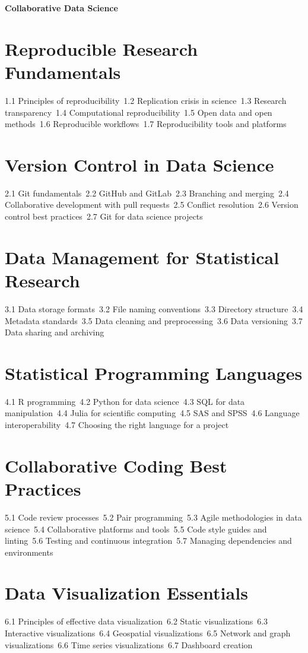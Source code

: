 {\LARGE \bf{Collaborative Data Science}}
\section{Reproducible Research Fundamentals}
1.1 Principles of reproducibility\
1.2 Replication crisis in science\
1.3 Research transparency\
1.4 Computational reproducibility\
1.5 Open data and open methods\
1.6 Reproducible workflows\
1.7 Reproducibility tools and platforms\
\section{Version Control in Data Science}
2.1 Git fundamentals\
2.2 GitHub and GitLab\
2.3 Branching and merging\
2.4 Collaborative development with pull requests\
2.5 Conflict resolution\
2.6 Version control best practices\
2.7 Git for data science projects\
\section{Data Management for Statistical Research}
3.1 Data storage formats\
3.2 File naming conventions\
3.3 Directory structure\
3.4 Metadata standards\
3.5 Data cleaning and preprocessing\
3.6 Data versioning\
3.7 Data sharing and archiving\
\section{Statistical Programming Languages}
4.1 R programming\
4.2 Python for data science\
4.3 SQL for data manipulation\
4.4 Julia for scientific computing\
4.5 SAS and SPSS\
4.6 Language interoperability\
4.7 Choosing the right language for a project\
\section{Collaborative Coding Best Practices}
5.1 Code review processes\
5.2 Pair programming\
5.3 Agile methodologies in data science\
5.4 Collaborative platforms and tools\
5.5 Code style guides and linting\
5.6 Testing and continuous integration\
5.7 Managing dependencies and environments\
\section{Data Visualization Essentials}
6.1 Principles of effective data visualization\
6.2 Static visualizations\
6.3 Interactive visualizations\
6.4 Geospatial visualizations\
6.5 Network and graph visualizations\
6.6 Time series visualizations\
6.7 Dashboard creation\
